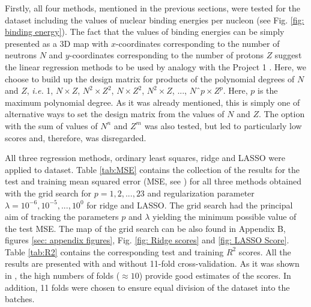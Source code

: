 \documentclass[numberedappendix, twocolappendix]{emulateapj}
\begin{document}
Firstly, all four methods, mentioned in the previous sections, were tested for the dataset including the values of nuclear binding energies per nucleon (see Fig. \ref{fig: binding energy}). The fact that the values of binding energies can be simply presented as a 3D map with $x$-coordinates corresponding to the number of neutrons $N$ and $y$-coordinates corresponding to the number of protons $Z$ suggest the linear regression methods to be used by analogy with the Project 1 \cite{proj1_1, proj1_2}. Here, we choose to build up the design matrix for products of the polynomial degrees of $N$ and $Z$, \textit{i.e.} 1, $N\times Z$, $N^2 \times Z^2$, $N\times Z^2$, $N^2 \times Z$, ..., $Nˆp\times Z^p$. Here, $p$ is the maximum polynomial degree. As it was already mentioned, this is simply one of alternative ways to set the design matrix from the values of $N$ and $Z$. The option with the sum of values of $N^n$ and $Z^m$ was also tested, but led to particularly low scores and, therefore, was disregarded. 

All three regression methods, ordinary least squares, ridge and LASSO were applied to dataset. Table \ref{tab:MSE} contains the collection of the results for the test and training mean squared error (MSE, see \cite{proj1_1,proj1_2, proj2}) for all three methods obtained with the grid search for $p=1, 2,..., 23$ and regularization parameter $\lambda=10^{-6}, 10^{-5}, ..., 10^{0}$ for ridge and LASSO. The grid search had the principal aim of tracking the parameters $p$ and $\lambda$ yielding the minimum possible value of the test MSE. The map of the grid search can be also found in Appendix B, figures \ref{sec: appendix figures}, Fig. \ref{fig: Ridge scores} and \ref{fig: LASSO Score}. Table \ref{tab:R2} contains the corresponding test and training $R^2$ scores. All the results are presented with and without 11-fold cross-validation. As it was shown in \cite{proj1_1}, the high numbers of folds ($\approx 10$) provide good estimates of the scores. In addition, 11 folds were chosen to ensure equal division of the dataset into the batches. 
\end{document}
